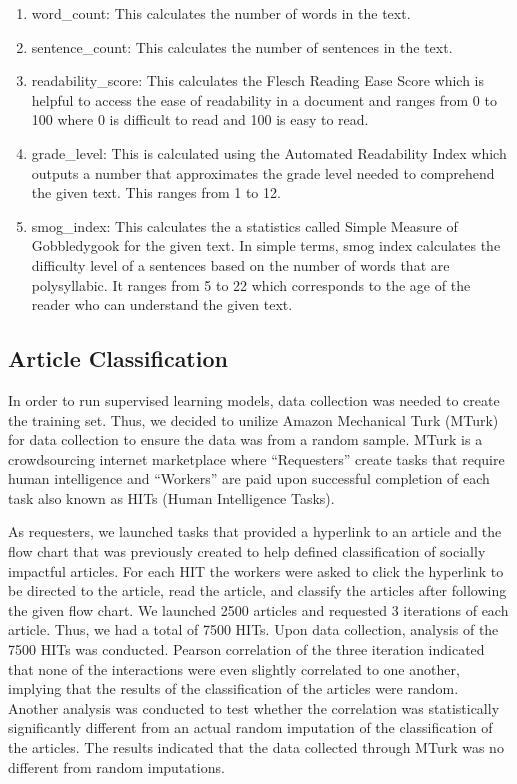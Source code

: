 \documentclass[10pt,letterpaper]{article}
\providecommand{\tightlist}{%
  \setlength{\itemsep}{0pt}\setlength{\parskip}{0pt}}
\begin{document}
\begin{enumerate}
\def\labelenumi{\arabic{enumi}.}
\tightlist
\item
  word\_count: This calculates the number of words in the text.
\item
  sentence\_count: This calculates the number of sentences in the text.
\item
  readability\_score: This calculates the Flesch Reading Ease Score
  which is helpful to access the ease of readability in a document and
  ranges from 0 to 100 where 0 is difficult to read and 100 is easy to
  read.
\item
  grade\_level: This is calculated using the Automated Readability Index
  which outputs a number that approximates the grade level needed to
  comprehend the given text. This ranges from 1 to 12.
\item
  smog\_index: This calculates the a statistics called Simple Measure of
  Gobbledygook for the given text. In simple terms, smog index
  calculates the difficulty level of a sentences based on the number of
  words that are polysyllabic. It ranges from 5 to 22 which corresponds
  to the age of the reader who can understand the given text.
\end{enumerate}

\subsection{Article Classification}\label{article-classification}

In order to run supervised learning models, data collection was needed
to create the training set. Thus, we decided to unilize Amazon
Mechanical Turk (MTurk) for data collection to ensure the data was from
a random sample. MTurk is a crowdsourcing internet marketplace where
``Requesters'' create tasks that require human intelligence and
``Workers'' are paid upon successful completion of each task also known
as HITs (Human Intelligence Tasks).

As requesters, we launched tasks that provided a hyperlink to an article
and the flow chart that was previously created to help defined
classification of socially impactful articles. For each HIT the workers
were asked to click the hyperlink to be directed to the article, read
the article, and classify the articles after following the given flow
chart. We launched 2500 articles and requested 3 iterations of each
article. Thus, we had a total of 7500 HITs. Upon data collection,
analysis of the 7500 HITs was conducted. Pearson correlation of the
three iteration indicated that none of the interactions were even
slightly correlated to one another, implying that the results of the
classification of the articles were random. Another analysis was
conducted to test whether the correlation was statistically
significantly different from an actual random imputation of the
classification of the articles. The results indicated that the data
collected through MTurk was no different from random imputations.
\end{document}
